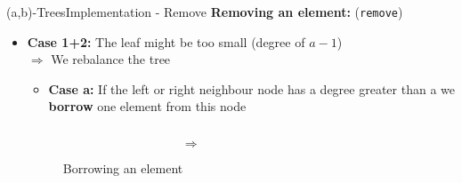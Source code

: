 
\begin{frame}{(a,b)-Trees}{Implementation - Remove}
  \textbf{Removing an element:} (\texttt{\color{Mittel-Blau}remove})
  \begin{itemize}
    \item
      \textbf{Case 1+2:}
      The leaf might be too small (degree of {\color{Mittel-Blau}$a-1$})\\
      $\Rightarrow$ We {\color{Mittel-Blau}rebalance} the tree
      \vspace{0.5em}
      \begin{itemize}
        \item
        \textbf{Case a:}
        If the left or right neighbour node has a degree greater than
        {\color{Mittel-Blau}a} we \textbf{borrow} one element from this node
      \end{itemize}
      \begin{figure}
        \begin{columns}
          \begin{column}{0.45\linewidth}
            \begin{adjustbox}{width=\linewidth}
              
            \end{adjustbox}
          \end{column}
          \begin{column}{0.1\linewidth}
            \begin{center}
              $\Rightarrow$
            \end{center}
          \end{column}
          \begin{column}{0.45\linewidth}
            \begin{adjustbox}{width=\linewidth}
              
            \end{adjustbox}
          \end{column}
        \end{columns}
        \caption{Borrowing an element}
        \label{fig:a_b_tree:move}
      \end{figure}
  \end{itemize}
\end{frame}


